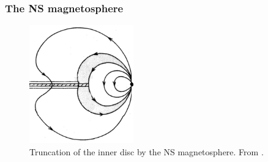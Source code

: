 \documentclass[a4paper,12pt,onecolumn]{article}
\makeatletter
\newcommand*{\bh}{BH\@\xspace}
\makeatother
\begin{document}

\subsubsection*{The NS magnetosphere}

\begin{figure}
\vspace*{-1cm}
\hspace*{0.1cm}
\includegraphics[height=5.1cm]{Figures/ghosh_lamb.png}
\caption{Truncation of the inner disc by the NS magnetosphere. From \cite{Ghosh1978}.}
\label{fig:ghosh}
\end{figure} 
\end{document}
